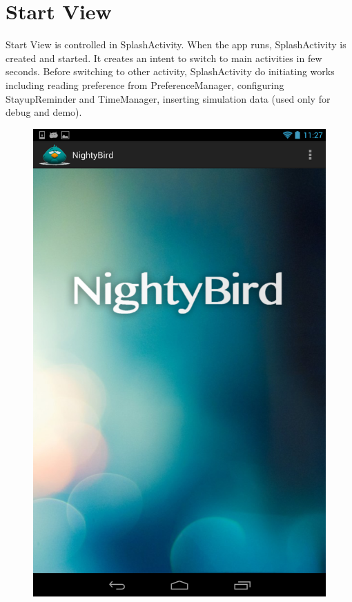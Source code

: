 \documentclass[14pt]{extreport}
\begin{document}
\section{Start View}
Start View is controlled in SplashActivity. When the app runs, SplashActivity is created and started. It creates an intent to switch to main activities in few seconds. Before switching to other activity, SplashActivity do initiating works including reading preference from PreferenceManager, configuring StayupReminder and TimeManager, inserting simulation data (used only for debug and demo). 
\begin{figure}[h]
\begin{center}
\includegraphics[width=5in]{starview}
\end{center}
\end{figure}
\end{document}
